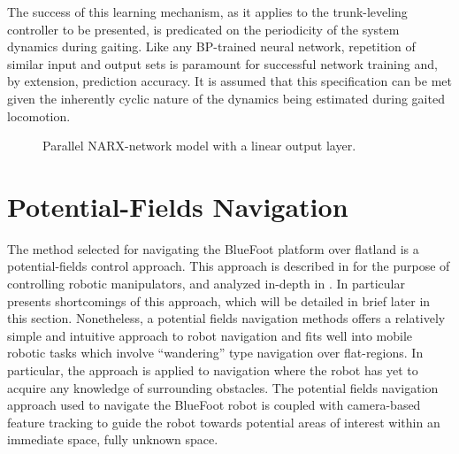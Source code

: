 		The success of this learning mechanism, as it applies to the trunk-leveling controller to be presented, is predicated on the periodicity of the system dynamics during gaiting. Like any BP-trained neural network, repetition of similar input and output sets is paramount for successful network training and, by extension, prediction accuracy. It is assumed that this specification can be met given the inherently cyclic nature of the dynamics being estimated during gaited locomotion. 
			\begin{figure}[t!]
				\centering
				\caption{Parallel NARX-network model with a linear output layer.}
				\label{fig::narx_net}
			\end{figure}

		\section{Potential-Fields Navigation}

		The method selected for navigating the BlueFoot platform over flatland is a potential-fields control approach. This approach is described in \cite{Hogan1984} for the purpose of controlling robotic manipulators, and analyzed in-depth in \cite{Koren1991}. In particular \cite{Koren1991} presents shortcomings of this approach, which will be detailed in brief later in this section. Nonetheless, a potential fields navigation methods offers a relatively simple and intuitive approach to robot navigation and fits well into mobile robotic tasks which involve ``wandering'' type navigation over flat-regions. In particular, the approach is applied to navigation where the robot has yet to acquire any knowledge of surrounding obstacles. The potential fields navigation approach used to navigate the BlueFoot robot is coupled with camera-based feature tracking to guide the robot towards potential areas of interest within an immediate space, fully unknown space.

